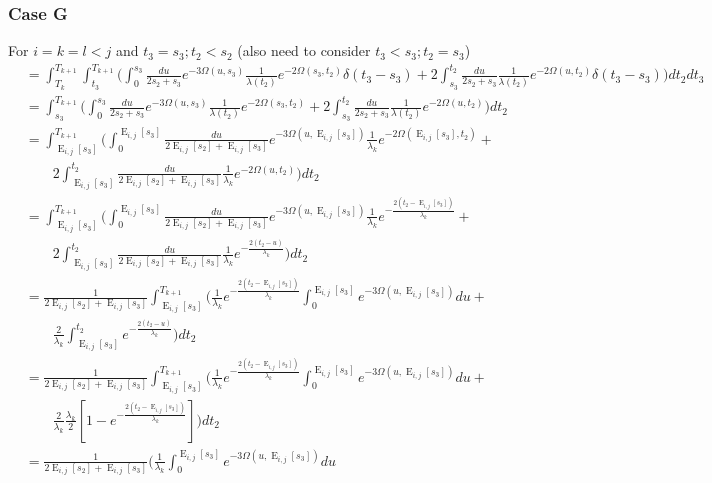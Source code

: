 \documentclass{article}
\DeclareMathOperator{\E}{E}
\begin{document}
\subsubsection{Case G}
For $i=k=l<j$ and $t_3=s_3; t_2<s_2$ (also need to consider $t_3<s_3;t_2=s_3$)
\begin{align*}
    &=\int_{T_k}^{T_{k+1}}\int_{t_3}^{T_{k+1}}\Bigg(
    \int_0^{s_3}\frac{du}{2s_2+s_3}e^{-3\Omega(u,s_3)}\frac{1}{\lambda(t_2)}e^{-2\Omega(s_3,t_2)}\delta(t_3-s_3)+
    2\int_{s_3}^{t_2}\frac{du}{2s_2+s_3}\frac{1}{\lambda(t_2)}e^{-2\Omega(u,t_2)}\delta(t_3-s_3)
    \Bigg)dt_2dt_3\\
    &=\int_{s_3}^{T_{k+1}}\Bigg(
    \int_0^{s_3}\frac{du}{2s_2+s_3}e^{-3\Omega(u,s_3)}\frac{1}{\lambda(t_2)}e^{-2\Omega(s_3,t_2)}+
    2\int_{s_3}^{t_2}\frac{du}{2s_2+s_3}\frac{1}{\lambda(t_2)}e^{-2\Omega(u,t_2)}
    \Bigg)dt_2\\
    &=\int_{\E_{i,j}[s_3]}^{T_{k+1}}\Bigg(
    \int_0^{\E_{i,j}[s_3]}\frac{du}{2\E_{i,j}[s_2]+\E_{i,j}[s_3]}e^{-3\Omega(u,\E_{i,j}[s_3])}\frac{1}{\lambda_k}e^{-2\Omega(\E_{i,j}[s_3],t_2)}+\\
    &\qquad
    2\int_{\E_{i,j}[s_3]}^{t_2}\frac{du}{2\E_{i,j}[s_2]+\E_{i,j}[s_3]}\frac{1}{\lambda_k}e^{-2\Omega(u,t_2)}
    \Bigg)dt_2\\
    &=\int_{\E_{i,j}[s_3]}^{T_{k+1}}\Bigg(
    \int_0^{\E_{i,j}[s_3]}\frac{du}{2\E_{i,j}[s_2]+\E_{i,j}[s_3]}e^{-3\Omega(u,\E_{i,j}[s_3])}\frac{1}{\lambda_k}e^{-\frac{2(t_2-\E_{i,j}[s_3])}{\lambda_k}}+\\
    &\qquad
    2\int_{\E_{i,j}[s_3]}^{t_2}\frac{du}{2\E_{i,j}[s_2]+\E_{i,j}[s_3]}\frac{1}{\lambda_k}e^{-\frac{2(t_2-u)}{\lambda_k}}
    \Bigg)dt_2\\
    &=\frac{1}{2\E_{i,j}[s_2]+\E_{i,j}[s_3]}\int_{\E_{i,j}[s_3]}^{T_{k+1}}\Bigg(
    \frac{1}{\lambda_k}e^{-\frac{2(t_2-\E_{i,j}[s_3])}{\lambda_k}}\int_0^{\E_{i,j}[s_3]}e^{-3\Omega(u,\E_{i,j}[s_3])}du+\\
    &\qquad
    \frac{2}{\lambda_k}\int_{\E_{i,j}[s_3]}^{t_2}e^{-\frac{2(t_2-u)}{\lambda_k}}
    \Bigg)dt_2\\
    &=\frac{1}{2\E_{i,j}[s_2]+\E_{i,j}[s_3]}\int_{\E_{i,j}[s_3]}^{T_{k+1}}\Bigg(
    \frac{1}{\lambda_k}e^{-\frac{2(t_2-\E_{i,j}[s_3])}{\lambda_k}}\int_0^{\E_{i,j}[s_3]}e^{-3\Omega(u,\E_{i,j}[s_3])}du+\\
    &\qquad
    \frac{2}{\lambda_k}\frac{\lambda_k}{2}\left[1-e^{-\frac{2\left(t_2-\E_{i,j}[s_3]\right)}{\lambda_k}}\right]
    \Bigg)dt_2\\
    &=\frac{1}{2\E_{i,j}[s_2]+\E_{i,j}[s_3]}\Bigg(\frac{1}{\lambda_k}\int_0^{\E_{i,j}[s_3]}e^{-3\Omega(u,\E_{i,j}[s_3])}du

\end{align*}
\end{document}
